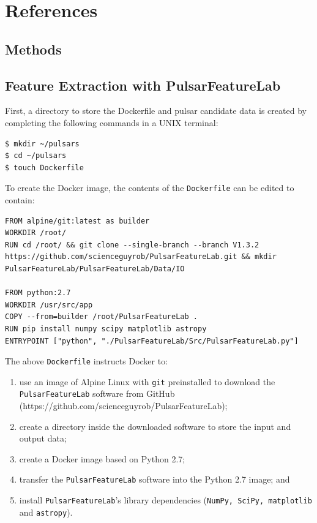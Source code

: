 \documentclass{article}
\begin{document}
\pagebreak
\section{References}
\printbibliography[heading=none]

\pagebreak
\begin{appendices}

    \section{Methods}
    \begin{subappendices}
        \subsection{Feature Extraction with PulsarFeatureLab}
        \label{apndx:pulsarfeaturelab}

        First, a directory to store the Dockerfile and pulsar candidate data is created by completing the following commands in a UNIX terminal:

        \begin{lstlisting}[numbers=none]
$ mkdir ~/pulsars
$ cd ~/pulsars
$ touch Dockerfile
        \end{lstlisting}

        To create the Docker image, the contents of the \verb|Dockerfile| can be edited to contain:

        \begin{lstlisting}[title=Dockerfile]
FROM alpine/git:latest as builder
WORKDIR /root/
RUN cd /root/ && git clone --single-branch --branch V1.3.2 https://github.com/scienceguyrob/PulsarFeatureLab.git && mkdir PulsarFeatureLab/PulsarFeatureLab/Data/IO

FROM python:2.7
WORKDIR /usr/src/app
COPY --from=builder /root/PulsarFeatureLab .
RUN pip install numpy scipy matplotlib astropy
ENTRYPOINT ["python", "./PulsarFeatureLab/Src/PulsarFeatureLab.py"]
        \end{lstlisting}

        The above \verb|Dockerfile| instructs Docker to:
        \begin{enumerate}[label=\roman*.]
            \item use an image of Alpine Linux with \verb|git| preinstalled to download the \verb|PulsarFeatureLab| software from GitHub \\(https://github.com/scienceguyrob/PulsarFeatureLab);
            \item create a directory inside the downloaded software to store the input and output data;
            \item create a Docker image based on Python 2.7;
            \item transfer the \verb|PulsarFeatureLab| software into the Python 2.7 image; and
            \item install \verb|PulsarFeatureLab|'s library dependencies (\verb|NumPy, SciPy, matplotlib| and \verb|astropy|).
        \end{enumerate}


\end{subappendices}
\end{appendices}
\end{document}
